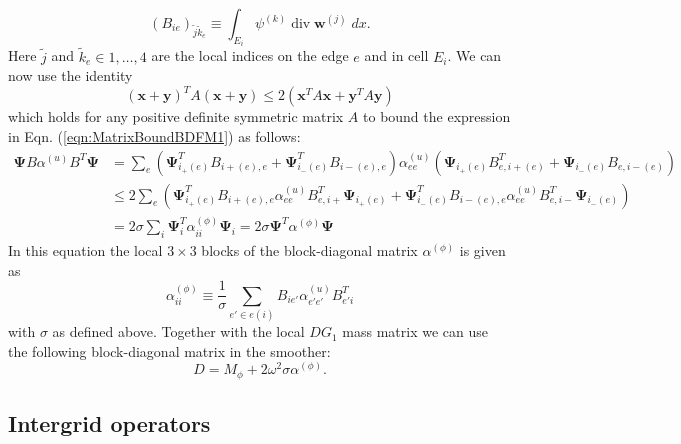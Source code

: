 \documentclass[12pt]{article}
\renewcommand{\vec}[1]{\boldsymbol{#1}}
\begin{document}
\begin{equation}
  (B_{ie})_{\tilde{j}\tilde{k}_e} \equiv \int_{E_i} \psi^{(k)} \operatorname{div}\vec{w}^{(j)}\; dx.
\end{equation}
Here $\tilde{j}$ and $\tilde{k}_e\in 1,\dots,4$ are the local indices on the edge $e$ and in cell $E_i$. We can now use the identity
\begin{equation}
\left(\vec{x}+\vec{y}\right)^T A \left(\vec{x}+\vec{y}\right)
\le 2\left(\vec{x}^T A\vec{x}+\vec{y}^T A\vec{y}\right)
\end{equation}
which holds for any positive definite symmetric matrix $A$ to bound the expression in Eqn. (\ref{eqn:MatrixBoundBDFM1}) as follows:
\begin{equation}
 \begin{aligned}
  \vec{\Psi} B \alpha^{(u)} B^T \vec{\Psi}
  &= \sum_{e} \left(\vec{\Psi}^T_{i_+(e)}B_{i+(e),e}+\vec{\Psi}^T_{i_-(e)}B_{i-(e),e}\right)\alpha^{(u)}_{ee}
\left(\vec{\Psi}_{i_+(e)}B^T_{e,i+(e)}+\vec{\Psi}_{i_-(e)}B_{e,i-(e)}\right)\\
  & \le 2\sum_e
\left(\vec{\Psi}^T_{i_+(e)}B_{i+(e),e}\alpha^{(u)}_{ee}B^T_{e,i+}\vec{\Psi}_{i_+(e)}
+\vec{\Psi}^T_{i_-(e)}B_{i-(e),e}\alpha^{(u)}_{ee}B^T_{e,i-}\vec{\Psi}_{i_-(e)}
\right)
\\
  &= 2 \sigma \sum_i \vec{\Psi}^T_i\alpha^{(\phi)}_{ii}\vec{\Psi}_i = 2\sigma \vec{\Psi}^T \alpha^{(\phi)}\vec{\Psi}
 \end{aligned}
\end{equation}
In this equation the local $3\times 3$ blocks of the block-diagonal matrix $\alpha^{(\phi)}$ is given as
\begin{equation}
  \alpha_{ii}^{(\phi)} \equiv \frac{1}{\sigma}\sum_{e'\in e(i)} B_{ie'}\alpha^{(u)}_{e'e'}B^T_{e'i}
\end{equation}
with $\sigma$ as defined above. 
Together with the local $DG_1$ mass matrix we can use the following block-diagonal matrix in the smoother:
\begin{equation}
  D = M_{\phi} + 2\omega^2 \sigma \alpha^{(\phi)}.
\end{equation}
\subsection{Intergrid operators}
\end{document}
